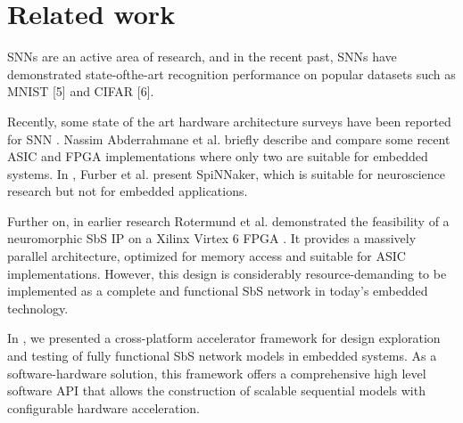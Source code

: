 \section{Related work}
\label{sec:related_work}
SNNs are an active area of research, and in the recent past, SNNs have demonstrated state-ofthe-art recognition performance on popular datasets such as MNIST [5] and CIFAR [6].

Recently, some state of the art hardware architecture surveys have been reported for SNN \cite{Design_Exploration_SbS_Trans20, SNN_Survey_Trans19, zhang2018survey}. Nassim Abderrahmane et al. briefly describe and compare some recent ASIC and FPGA implementations where only two are suitable for embedded systems. In \cite{Spinnaker_Trans13}, Furber et al. present SpiNNaker, which is suitable for neuroscience research but not for embedded applications.


Further on, in earlier research Rotermund et al. demonstrated the feasibility of a neuromorphic SbS IP on a Xilinx Virtex 6 FPGA \cite{rotermund2018massively}. It provides a massively parallel architecture, optimized for memory access and suitable for ASIC implementations. However, this design is considerably resource-demanding to be implemented as a complete and functional SbS network in today's embedded technology.

In \cite{nevarez2020accelerator}, we presented a cross-platform accelerator framework for design exploration and testing of fully functional SbS network models in embedded systems. As a software-hardware solution, this framework offers a comprehensive high level software API that allows the construction of scalable sequential models with configurable hardware acceleration.

